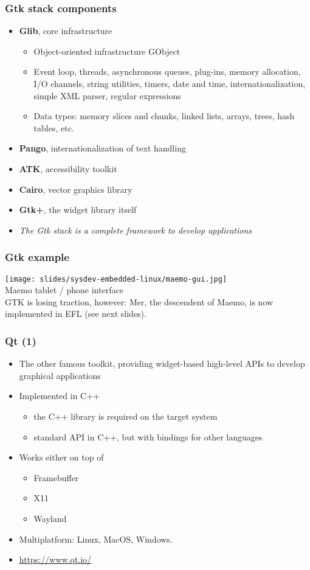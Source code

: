 \begin{frame}
  \frametitle{Gtk stack components}
  \begin{itemize}
  \item {\bf Glib}, core infrastructure
    \begin{itemize}
    \item Object-oriented infrastructure GObject
    \item Event loop, threads, asynchronous queues, plug-ins, memory
      allocation, I/O channels, string utilities, timers, date and
      time, internationalization, simple XML parser, regular
      expressions
    \item Data types: memory slices and chunks, linked lists, arrays,
      trees, hash tables, etc.
    \end{itemize}
  \item {\bf Pango}, internationalization of text handling
  \item {\bf ATK}, accessibility toolkit
  \item {\bf Cairo}, vector graphics library
  \item {\bf Gtk+}, the widget library itself
  \item {\em The Gtk stack is a complete framework to develop applications}
  \end{itemize}
\end{frame}

\begin{frame}
  \frametitle{Gtk example}
    \texttt{[image: slides/sysdev-embedded-linux/maemo-gui.jpg]}\\
    Maemo tablet / phone interface\\
    GTK is losing traction, however:
    Mer, the descendent of Maemo, is now implemented in EFL (see next
    slides).\\
\end{frame}

\begin{frame}
  \frametitle{Qt (1)}
  \begin{itemize}
  \item The other famous toolkit, providing widget-based high-level APIs to
    develop graphical applications
  \item Implemented in C++
    \begin{itemize}
    \item the C++ library is required on the target system
    \item standard API in C++, but with bindings for other languages
    \end{itemize}
  \item Works either on top of
    \begin{itemize}
    \item Framebuffer
    \item X11
    \item Wayland
    \end{itemize}
  \item Multiplatform: Linux, MacOS, Windows.
  \item \url{https://www.qt.io/}
  \end{itemize}
\end{frame}

